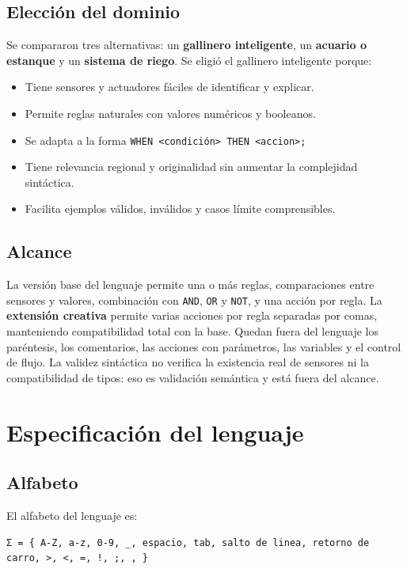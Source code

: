 \documentclass[12pt,a4paper]{article}
\begin{document}
\subsection{Elección del dominio}
Se compararon tres alternativas: un \textbf{gallinero inteligente}, un
\textbf{acuario o estanque} y un \textbf{sistema de riego}. Se eligió el
gallinero inteligente porque:

\begin{itemize}
  \item Tiene sensores y actuadores fáciles de identificar y explicar.
  \item Permite reglas naturales con valores numéricos y booleanos.
  \item Se adapta a la forma \texttt{WHEN <condición> THEN <accion>;}
  \item Tiene relevancia regional y originalidad sin aumentar la complejidad
        sintáctica.
  \item Facilita ejemplos válidos, inválidos y casos límite comprensibles.
\end{itemize}

\subsection{Alcance}
La versión base del lenguaje permite una o más reglas, comparaciones entre
sensores y valores, combinación con \texttt{AND}, \texttt{OR} y \texttt{NOT},
y una acción por regla. La \textbf{extensión creativa} permite varias acciones
por regla separadas por comas, manteniendo compatibilidad total con la base.
Quedan fuera del lenguaje los paréntesis, los comentarios, las acciones con
parámetros, las variables y el control de flujo. La validez sintáctica no
verifica la existencia real de sensores ni la compatibilidad de tipos: eso es
validación semántica y está fuera del alcance.

\section{Especificación del lenguaje}

\subsection{Alfabeto}
El alfabeto del lenguaje es:

\begin{lstlisting}
Σ = { A-Z, a-z, 0-9, _, espacio, tab, salto de linea, retorno de carro, >, <, =, !, ;, , }
\end{lstlisting}
\end{document}
